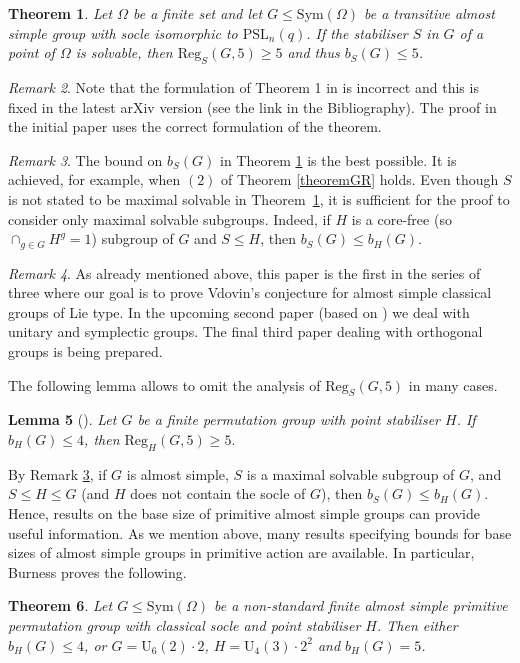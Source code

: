 \documentclass[a4paper,reqno,11pt]{amsart}
\newtheorem{Th}{Theorem}[section]
\newtheorem{Lem}[Th]{Lemma}
\theoremstyle{definition}
\theoremstyle{remark}
\newtheorem{Rem}[Th]{Remark}
\numberwithin{equation}{section}
\newcommand{\Sym}{\mathrm{Sym}}
\newcommand{\Reg}{\mathrm{Reg}}
\newcommand{\PSL}{{\mathrm{PSL}}}
\begin{document}
  \begin{Th}
\label{fulltheoremPSL}
Let $\Omega$ be a finite set and let $G\le \Sym(\Omega)$ be a transitive almost simple group with socle isomorphic to $\PSL_n(q)$. If the stabiliser $S$ in $G$ of a point of $\Omega$ is solvable, then $\Reg_S(G,5)\ge 5$ and thus $b_S(G) \le 5$.
\end{Th}

\begin{Rem}
 Note that the formulation of Theorem 1  in \cite{vd} is incorrect and this is fixed in the latest arXiv version (see the link in the Bibliography). The proof in the initial paper uses the correct formulation of the theorem.
\end{Rem}


\begin{Rem}\label{remSleH}
The bound on $b_S(G)$ in Theorem \ref{fulltheoremPSL} is the best possible. It is achieved, for example, when $(2)$ of Theorem \ref{theoremGR} holds. Even though $S$ is not stated to be maximal solvable in Theorem~\ref{fulltheoremPSL}, it is sufficient for the proof to consider only maximal solvable subgroups. Indeed, if $H$ is a core-free (so $\cap_{g\in G} H^g=1$) subgroup of $G$  and $S \le H$, then $b_S(G) \le b_H(G)$.
\end{Rem}

\begin{Rem}
As already mentioned above, this paper is the first in the series of three where our goal is to prove Vdovin's conjecture for almost simple classical groups of Lie type.  In the upcoming second paper (based on \cite{thesis}) we deal with unitary and symplectic groups. The final third paper dealing with orthogonal groups is being prepared. 
\end{Rem}

The following lemma allows to omit the analysis of $\Reg_S(G,5)$ in many cases.
  \begin{Lem}[{\cite[Lemma 3]{bay}}] \label{base4}
Let $G$ be a finite permutation group with point stabiliser $H$. If  $b_H(G)\le 4$, then $\Reg_H(G,5)\ge 5.$
\end{Lem}

  By Remark \ref{remSleH}, if $G$ is almost simple, $S$ is a maximal solvable subgroup of $G$, and  $S \le H \le G$ (and $H$ does not contain the socle of $G$), then $b_S(G) \le b_H(G).$ Hence, results on the base size of primitive almost simple groups can provide useful information.
As we mention above, many results specifying bounds for base sizes of almost simple groups in primitive action are available. 
In particular, Burness \cite{burness} proves the following.
\begin{Th}
\label{bernclass}
Let $G \le \Sym(\Omega)$ be a non-standard finite almost simple  primitive permutation   group with classical socle and  point stabiliser $H$. Then either $b_H(G) \le 4$, or $G = \mathrm{U}_6 (2) \cdot 2$, $H = \mathrm{U}_4 (3) \cdot 2^2$ and $b_H(G) = 5$.
\end{Th}
\end{document}
